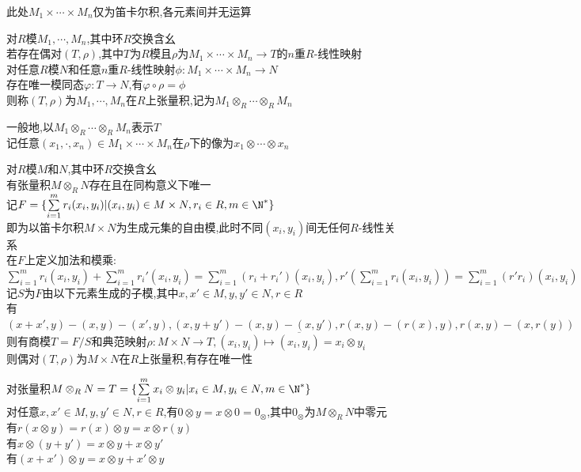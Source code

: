 \begin{zhu}
此处$M_1\times\cdots\times M_n$仅为笛卡尔积,各元素间并无运算
\end{zhu}

\begin{dingyi}
对$R$模$M_1,\cdots,M_n$,其中环$R$交换含幺\\
若存在偶对$(T,\rho)$,其中$T$为$R$模且$\rho$为$M_1\times\cdots\times M_n\to T$的$n$重$R$-线性映射\\
对任意$R$模$N$和任意$n$重$R$-线性映射$\phi:M_1\times\cdots\times M_n\to N$\\
存在唯一模同态$\varphi:T\to N$,有$\varphi\circ\rho=\phi$\\
则称$(T,\rho)$为$M_1,\cdots,M_n$在$R$上张量积,记为$M_1\otimes_{R}\cdots\otimes_{R}M_n$
\end{dingyi}

\begin{zhu}一般地,以$M_1\otimes_{R}\cdots\otimes_{R}M_n$表示$T$\\
记任意$(x_1,\cdot,x_n)\in M_1\times\cdots\times M_n$在$\rho$下的像为$x_1\otimes\cdots\otimes x_n$
\end{zhu}

\begin{dingli}
对$R$模$M$和$N$,其中环$R$交换含幺\\
有张量积$M\otimes_{R}N$存在且在同构意义下唯一\\
记$F=\{\sum\limits_{i=1}^{m}r_i(x_i,y_i)|(x_i,y_i)\in M\times N,r_i\in R,m\in \N^*\}$\\
即为以笛卡尔积$M\times N$为生成元集的自由模,此时不同$(x_i,y_i)$间无任何$R$-线性关系\\
在$F$上定义加法和模乘:\\
$\sum\limits_{i=1}^{m}r_i(x_i,y_i)+\sum\limits_{i=1}^{m}r_i'(x_i,y_i)=\sum\limits_{i=1}^{m}(r_i+r_i')(x_i,y_i),r'(\sum\limits_{i=1}^{m}r_i(x_i,y_i))=\sum\limits_{i=1}^{m}(r'r_i)(x_i,y_i)$\\
记$S$为$F$由以下元素生成的子模,其中$x,x'\in M,y,y'\in N,r\in R$\\
有$(x+x',y)-(x,y)-(x',y),(x,y+y')-(x,y)-(x,y'),r(x,y)-(r(x),y),r(x,y)-(x,r(y))$\\
则有商模$T=F/S$和典范映射$\rho:M\times N\to T,(x_i,y_i)\mapsto \overline{(x_i,y_i)}=x_i\otimes y_i$\\
则偶对$(T,\rho)$为$M\times N$在$R$上张量积,有存在唯一性
\end{dingli}

\begin{zhu}
对张量积$M\otimes_{R}N=T=\{\sum\limits_{i=1}^{m}x_i\otimes y_i|x_i\in M,y_i\in N,m\in \N^*\}$\\
对任意$x,x'\in M,y,y'\in N,r\in R$,有$0\otimes y=x\otimes 0=0_{\otimes}$,其中$0_{\otimes}$为$M\otimes_{R}N$中零元\\
有$r(x\otimes y)=r(x)\otimes y=x\otimes r(y)$\\
有$x\otimes(y+y')=x\otimes y+x\otimes y'$\\
有$(x+x')\otimes y=x\otimes y+x'\otimes y$
\end{zhu}

